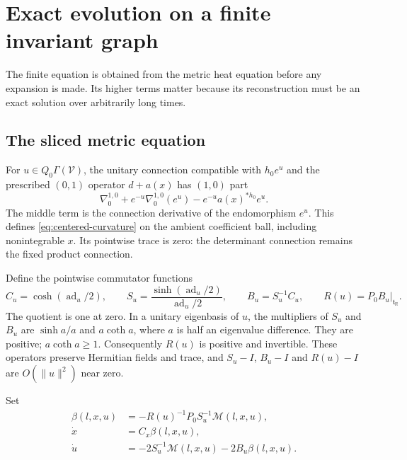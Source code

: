 \documentclass[11pt]{amsart}
\theoremstyle{definition}
\theoremstyle{remark}
\newcommand{\RR}{\mathbb R}
\newcommand{\ad}{\operatorname{ad}}
\begin{document}
\section{Exact evolution on a finite invariant graph}\label{sec:reduction}

The finite equation is obtained from the metric heat equation before
any expansion is made. Its higher terms matter because its
reconstruction must be an exact solution over arbitrarily long times.

\subsection{The sliced metric equation}
For $u\in Q_0\Gamma(\mathcal V)$, the unitary connection compatible
with $h_0e^u$ and the prescribed $(0,1)$ operator $d+a(x)$ has
$(1,0)$ part
\begin{equation}\label{eq:connection}
 \nabla_0^{1,0}
   +e^{-u}\nabla_0^{1,0}(e^u)
   -e^{-u}a(x)^{*h_0}e^u .
\end{equation}
The middle term is the connection derivative of the endomorphism
$e^u$. This defines \eqref{eq:centered-curvature} on the ambient
coefficient ball, including nonintegrable $x$. Its pointwise trace
is zero: the determinant connection remains the fixed product
connection.

Define the pointwise commutator functions
\begin{equation}\label{eq:commutator-functions}
 C_u=\cosh(\ad_u/2),\qquad
 S_u=\frac{\sinh(\ad_u/2)}{\ad_u/2},\qquad
 B_u=S_u^{-1}C_u,\qquad
 R(u)=P_0B_u|_{\mathfrak t_{\RR}}.
\end{equation}
The quotient is one at zero. In a unitary eigenbasis of $u$, the
multipliers of $S_u$ and $B_u$ are $\sinh a/a$ and $a\coth a$,
where $a$ is half an eigenvalue difference. They are positive;
$a\coth a\ge1$. Consequently $R(u)$ is positive and invertible.
These operators preserve Hermitian fields and trace, and
$S_u-I$, $B_u-I$ and $R(u)-I$ are $O(\|u\|^2)$ near zero.

Set
\begin{equation}\label{eq:exact-slice}
 \begin{aligned}
 \beta(l,x,u)&=-R(u)^{-1}P_0S_u^{-1}\mathcal M(l,x,u),\\
 \dot x&=C_x\beta(l,x,u),\\
 \dot u&=-2S_u^{-1}\mathcal M(l,x,u)-2B_u\beta(l,x,u).
 \end{aligned}
\end{equation}
\end{document}

